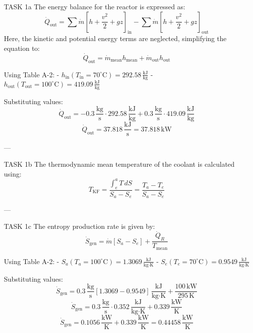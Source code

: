 TASK 1a  
The energy balance for the reactor is expressed as:  
\[
\dot{Q}_{\text{out}} = \sum \dot{m} \left[ h + \frac{v^2}{2} + gz \right]_{\text{in}} - \sum \dot{m} \left[ h + \frac{v^2}{2} + gz \right]_{\text{out}}
\]  
Here, the kinetic and potential energy terms are neglected, simplifying the equation to:  
\[
\dot{Q}_{\text{out}} = \dot{m}_{\text{mean}} h_{\text{mean}} + \dot{m}_{\text{out}} h_{\text{out}}
\]  

Using Table A-2:  
- \( h_{\text{in}} (T_{\text{in}} = 70^\circ\text{C}) = 292.58 \, \frac{\text{kJ}}{\text{kg}} \)  
- \( h_{\text{out}} (T_{\text{out}} = 100^\circ\text{C}) = 419.09 \, \frac{\text{kJ}}{\text{kg}} \)  

Substituting values:  
\[
\dot{Q}_{\text{out}} = -0.3 \, \frac{\text{kg}}{\text{s}} \cdot 292.58 \, \frac{\text{kJ}}{\text{kg}} + 0.3 \, \frac{\text{kg}}{\text{s}} \cdot 419.09 \, \frac{\text{kJ}}{\text{kg}}
\]  
\[
\dot{Q}_{\text{out}} = 37.818 \, \frac{\text{kJ}}{\text{s}} = 37.818 \, \text{kW}
\]  

---

TASK 1b  
The thermodynamic mean temperature of the coolant is calculated using:  
\[
T_{\text{KF}} = \frac{\int_{e}^{a} T \, dS}{S_a - S_e} = \frac{T_a - T_e}{S_a - S_e}
\]  

---

TASK 1c  
The entropy production rate is given by:  
\[
\dot{S}_{\text{gen}} = \dot{m} \left[ S_a - S_e \right] + \frac{\dot{Q}_R}{T_{\text{mean}}}
\]  

Using Table A-2:  
- \( S_a (T_a = 100^\circ\text{C}) = 1.3069 \, \frac{\text{kJ}}{\text{kg·K}} \)  
- \( S_e (T_e = 70^\circ\text{C}) = 0.9549 \, \frac{\text{kJ}}{\text{kg·K}} \)  

Substituting values:  
\[
\dot{S}_{\text{gen}} = 0.3 \, \frac{\text{kg}}{\text{s}} \left[ 1.3069 - 0.9549 \right] \, \frac{\text{kJ}}{\text{kg·K}} + \frac{100 \, \text{kW}}{295 \, \text{K}}
\]  
\[
\dot{S}_{\text{gen}} = 0.3 \, \frac{\text{kg}}{\text{s}} \cdot 0.352 \, \frac{\text{kJ}}{\text{kg·K}} + 0.339 \, \frac{\text{kW}}{\text{K}}
\]  
\[
\dot{S}_{\text{gen}} = 0.1056 \, \frac{\text{kW}}{\text{K}} + 0.339 \, \frac{\text{kW}}{\text{K}} = 0.44458 \, \frac{\text{kW}}{\text{K}}
\]  